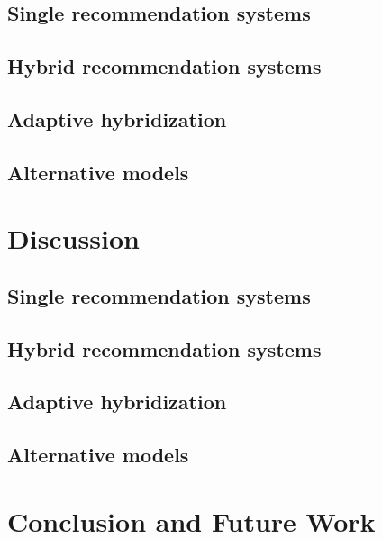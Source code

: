 \documentclass[10pt]{reportMaster}
\begin{document}
\section{Single recommendation systems}

\section{Hybrid recommendation systems}

\section{Adaptive hybridization}

\section{Alternative models}







\chapter{Discussion}

\section{Single recommendation systems}

\section{Hybrid recommendation systems}

\section{Adaptive hybridization}

\section{Alternative models}







\chapter{Conclusion and Future Work}
\end{document}
